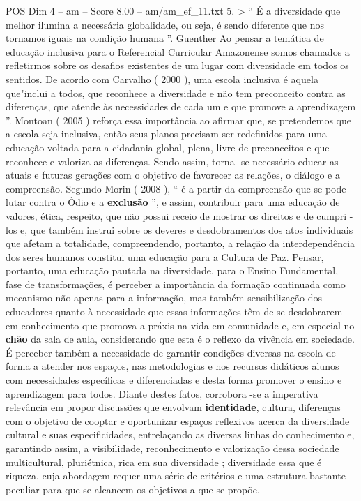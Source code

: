 \begin{textsample}{POS Dim 4 – am – Score 8.00 – am/am\_ef\_11.txt}  \label{ex:f4_pos_110}
5. > “ É a diversidade que melhor ilumina a necessária globalidade, ou seja, é sendo diferente que nos tornamos iguais na condição humana ”.
Guenther Ao pensar a temática de educação inclusiva para o Referencial Curricular Amazonense somos chamados a refletirmos sobre os desafios existentes de um lugar com diversidade em todos os sentidos.
De acordo com Carvalho ( 2000 ), uma escola inclusiva é aquela que"inclui a todos, que reconhece a diversidade e não tem preconceito contra as diferenças, que atende às necessidades de cada um e que promove a aprendizagem ”.
Montoan ( 2005 ) reforça essa importância ao afirmar que, se pretendemos que a escola seja inclusiva, então seus planos precisam ser redefinidos para uma educação voltada para a cidadania global, plena, livre de preconceitos e que reconhece e valoriza as diferenças.
Sendo assim, torna -se necessário educar as atuais e futuras gerações com o objetivo de favorecer as relações, o diálogo e a compreensão.
Segundo Morin ( 2008 ), “ é a partir da compreensão que se pode lutar contra o Ódio e a \textbf{exclusão} ”, e assim, contribuir para uma educação de valores, ética, respeito, que não possui receio de mostrar os direitos e de cumpri -los e, que também instrui sobre os deveres e desdobramentos dos atos individuais que afetam a totalidade, compreendendo, portanto, a relação da interdependência dos seres humanos constitui uma educação para a Cultura de Paz.
Pensar, portanto, uma educação pautada na diversidade, para o Ensino Fundamental, fase de transformações, é perceber a importância da formação continuada como mecanismo não apenas para a informação, mas também sensibilização dos educadores quanto à necessidade que essas informações têm de se desdobrarem em conhecimento que promova a práxis na vida em comunidade e, em especial no \textbf{chão} da sala de aula, considerando que esta é o reflexo da vivência em sociedade.
É perceber também a necessidade de garantir condições diversas na escola de forma a atender nos espaços, nas metodologias e nos recursos didáticos alunos com necessidades específicas e diferenciadas e desta forma promover o ensino e aprendizagem para todos.
Diante destes fatos, corrobora -se a imperativa relevância em propor discussões que envolvam \textbf{identidade}, cultura, diferenças com o objetivo de cooptar e oportunizar espaços reflexivos acerca da diversidade cultural e suas especificidades, entrelaçando as diversas linhas do conhecimento e, garantindo assim, a visibilidade, reconhecimento e valorização dessa sociedade multicultural, pluriétnica, rica em sua diversidade ; diversidade essa que é riqueza, cuja abordagem requer uma série de critérios e uma estrutura bastante peculiar para que se alcancem os objetivos a que se propõe.

\end{textsample}
